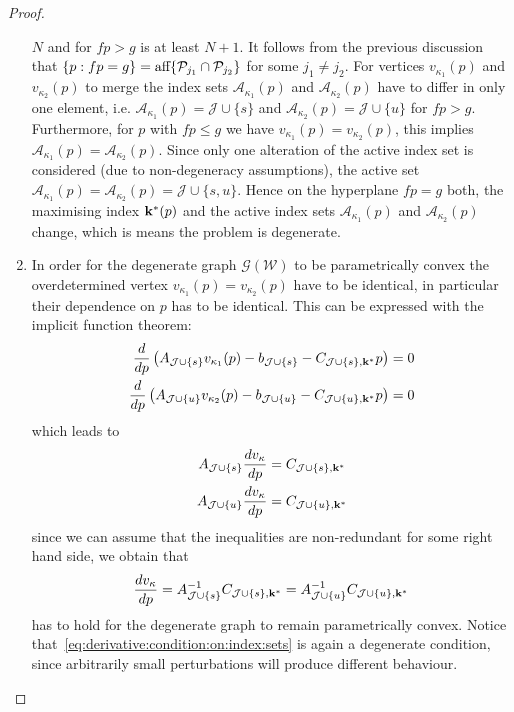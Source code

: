 \documentclass[journal]{IEEEtran}
\theoremstyle{remark}
\theoremstyle{definition}
\begin{document}
\begin{proof}
\begin{enumerate}
$N$ and for $fp>g$ is at least $N+1$.
%
It follows from the previous discussion that $\{p:fp=g\} = \textup{aff}\{\mathcal P_{j_1}\cap\mathcal P_{j_2}\}$ for some $j_1\neq j_2$.
%
For vertices $v_{\kappa_1}(p)$ and $v_{\kappa_2}(p)$ to merge the index sets $\mathcal A_{\kappa_1}(p)$ and 
$\mathcal A_{\kappa_2}(p)$ have to differ in only one 
element, i.e. $\mathcal A_{\kappa_1}(p) = \mathcal J\cup \{s\}$ and $\mathcal A_{\kappa_2}(p) = \mathcal J\cup\{u\}$ for $fp>g$.
%
Furthermore, for $p$ with $fp\leq g$ we have $v_{\kappa_1}(p)=v_{\kappa_2}(p)$, this implies $\mathcal A_{\kappa_1}(p) = 
\mathcal A_{\kappa_2}(p)$.
%
Since only one alteration of the active index set is considered (due to non-degeneracy assumptions), the active set 
$\mathcal A_{\kappa_1}(p) = \mathcal A_{\kappa_2}(p) = \mathcal J \cup \{s,u\}$.
%
Hence on the hyperplane $fp=g$ both, the maximising index ${\bf{k}}^\ast(p)$ and the active index sets $\mathcal A_{\kappa_1}(p)$ 
and $\mathcal A_{\kappa_2}(p)$ change, which is means the problem is degenerate.
%
\item In order for the degenerate graph $\mathscr G(\mathcal W)$ to be parametrically convex the overdetermined 
vertex $v_{\kappa_1}(p)=v_{\kappa_2}(p)$ have to be identical, in particular their dependence on $p$ has to be identical.
%
This can be expressed with the implicit function theorem:
%
\begin{equation*}\begin{split}
  \frac{d}{dp}\left(  A_{\mathcal J\cup \{s\}} v_{\kappa_1}(p) - b_{\mathcal J\cup \{s\}} - C_{\mathcal J\cup \{s\},{\bf{k}}^\ast} p\right) &= 0\\
  \frac{d}{dp}\left(  A_{\mathcal J\cup \{u\}} v_{\kappa_2}(p) - b_{\mathcal J\cup \{u\}} - C_{\mathcal J\cup \{u\},{\bf{k}}^\ast} p\right) &= 0
\end{split}\end{equation*}
%
which leads to 
%
\begin{equation*}\begin{split}
  A_{\mathcal J\cup \{s\}} \frac{dv_{\kappa}}{dp} &= C_{\mathcal J\cup \{s\},{\bf{k}}^\ast}\\
  A_{\mathcal J\cup \{u\}} \frac{dv_{\kappa}}{dp} &= C_{\mathcal J\cup \{u\},{\bf{k}}^\ast}
\end{split}\end{equation*}
%
since we can assume that the inequalities are non-redundant for some right hand side, we obtain that 
%
\begin{equation}\label{eq:derivative:condition:on:index:sets}
  \frac{dv_\kappa}{dp} = A_{\mathcal J\cup \{s\}}^{-1}C_{\mathcal J\cup \{s\},{\bf{k}}^\ast} = 
  A_{\mathcal J\cup \{u\}}^{-1}C_{\mathcal J\cup \{u\},{\bf{k}}^\ast}
\end{equation}
%
has to hold for the degenerate graph to remain parametrically convex.
%
Notice that~\eqref{eq:derivative:condition:on:index:sets} is again a degenerate condition, since arbitrarily small perturbations
will produce different behaviour.
\end{enumerate}
\end{proof}
\end{document}
